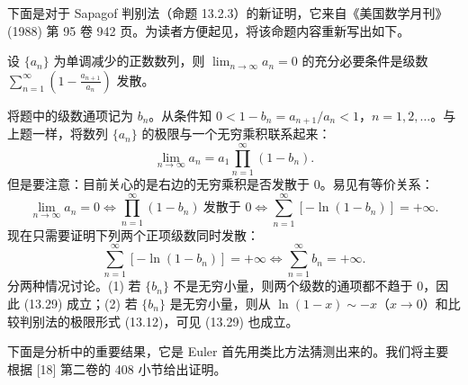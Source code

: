 下面是对于 Sapagof 判别法（命题 13.2.3）的新证明，它来自《美国数学月刊》(1988) 第 95 卷 942 页。为读者方便起见，将该命题内容重新写出如下。

\begin{xexample}[13.4.2]
设 $\{a_n\}$ 为单调减少的正数数列，则 $\lim_{n\to\infty}a_n=0$ 的充分必要条件是级数 $\sum_{n=1}^{\infty}\left(1-\frac{a_{n+1}}{a_n}\right)$ 发散。
\end{xexample}
\begin{xproof}
将题中的级数通项记为 $b_n$。从条件知 $0<1-b_n=a_{n+1}/a_n<1$，$n=1,2,\ldots$。与上题一样，将数列 $\{a_n\}$ 的极限与一个无穷乘积联系起来：
\[
\lim_{n\to\infty}a_n=a_1\prod_{n=1}^{\infty}(1-b_n).
\]
但是要注意：目前关心的是右边的无穷乘积是否发散于 0。易见有等价关系：
\[
\lim_{n\to\infty}a_n=0\Longleftrightarrow\prod_{n=1}^{\infty}(1-b_n)\ \text{发散于 }0
\Longleftrightarrow\sum_{n=1}^{\infty}[-\ln(1-b_n)]=+\infty.
\]
现在只需要证明下列两个正项级数同时发散：
\begin{equation}
\sum_{n=1}^{\infty}[-\ln(1-b_n)]=+\infty\Longleftrightarrow\sum_{n=1}^{\infty}b_n=+\infty.
\tag{13.29}
\end{equation}
分两种情况讨论。(1) 若 $\{b_n\}$ 不是无穷小量，则两个级数的通项都不趋于 0，因此 (13.29) 成立；(2) 若 $\{b_n\}$ 是无穷小量，则从 $\ln(1-x)\sim-x$（$x\to0$）和比较判别法的极限形式 (13.12)，可见 (13.29) 也成立。
\end{xproof}

下面是分析中的重要结果，它是 Euler 首先用类比方法猜测出来的。我们将主要根据 [18] 第二卷的 408 小节给出证明。

